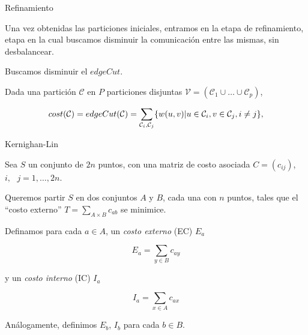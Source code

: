 \begin{frame}{Refinamiento}

Una vez obtenidas las particiones iniciales, entramos en la etapa de
refinamiento, etapa en la cual buscamos disminuir la comunicación entre
las mismas, sin desbalancear.
\pause

Buscamos disminuir el $edgeCut$.
\pause

Dada una partición $\mathcal{C}$ en $P$ particiones disjuntas
$\mathcal{V} = (\mathcal{C}_1 \cup \ldots \cup \mathcal{C}_p)$,

\begin{equation*}
\begin{aligned}
    cost(\mathcal{C}) = edgeCut(\mathcal{C}) =  \sum_{\mathcal{C}_i
    , \mathcal{C}_j} \{ w(u, v) | u \in \mathcal{C}_i, v \in 
    \mathcal{C}_j, i \neq j \}\text{{\color{black},}}
\end{aligned}
\end{equation*}


\end{frame}


\begin{frame}{Kernighan-Lin}

Sea $S$ un conjunto de $2n$ puntos, con una matriz de costo asociada 
$C = (c_{ij})$, $i, \text{ } j = 1, \ldots, 2n$.

Queremos partir $S$ en dos conjuntos $A$ y $B$, cada una con $n$ puntos,
tales que el ``costo externo'' $T = \sum_{A \times B} c_{ab}$ se minimice.

Definamos para cada $a \in A$, un \textit{costo externo} (EC) $E_a$

\begin{equation*}
    E_a = \sum_{y \in B} c_{ay}
\end{equation*}

y un \textit{costo interno} (IC) $I_a$

\begin{equation*}
    I_a = \sum_{x \in A} c_{ax}
\end{equation*}

Análogamente, definimos 
$E_b$, $I_b$ para cada $b \in B$.

\end{frame}


